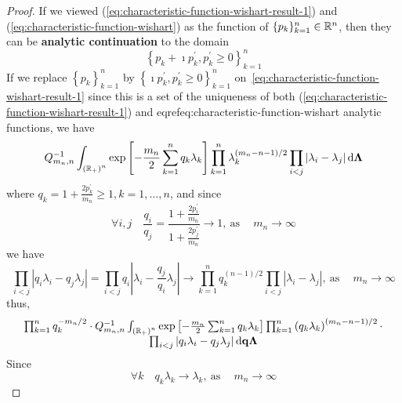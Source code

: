 \begin{proof}
	If we viewed (\ref{eq:characteristic-function-wishart-result-1}) and (\ref{eq:characteristic-function-wishart}) as the function of \(\{p_{k}\}_{k=1}^{n}\in\mathbb{R}^{n}\), then they can be \textbf{analytic continuation} to the domain
	\begin{equation*}
		\left\{p_{k}+\imath p_{k}^{\prime},p_{k}^{\prime}\geq 0\right\}_{k=1}^{n}
	\end{equation*}
	If we replace \(\left\{p_{k}\right\}_{k=1}^{n}\) by \(\left\{\imath p_{k}^{\prime},p_{k}^{\prime}\geq 0\right\}_{k=1}^{n}\) on~\eqref{eq:characteristic-function-wishart-result-1} since this is a set of the uniqueness of both (\ref{eq:characteristic-function-wishart-result-1}) and eqref{eq:characteristic-function-wishart} analytic functions, we have
	\begin{equation*}
		Q_{m_{n},n}^{-1}\int_{\left(\mathbb{R}_{+}\right)^{n}}\exp\left[-\frac{m_{n}}{2}\sum_{k=1}^{n}q_{k}\lambda_{k}\right]\prod_{k=1}^{n}\lambda_{k}^{(m_{n}-n-1)/2}\prod_{i<j}\left|\lambda_{i}-\lambda_{j}\right|\mathop{}\!\mathrm{d}\boldsymbol{\Lambda}
	\end{equation*}
	where \(q_{k}=1+\frac{2p_{k}^{\prime}}{m_{n}}\geq 1,k=1,\ldots,n\), and since
	\begin{equation*}
		\forall i,j\quad\frac{q_{i}}{q_{j}}=\frac{1+\frac{2p_{i}^{\prime}}{m_{n}}}{1+\frac{2p_{j}^{\prime}}{m_{n}}}\rightarrow 1,\ \text{as}\ \quad m_{n}\rightarrow\infty
	\end{equation*}
	we have
	\begin{equation*}
		\prod_{i<j}\left|q_{i}\lambda_{i}-q_{j}\lambda_{j}\right|=\prod_{i<j}q_{i}\left|\lambda_{i}-\frac{q_{j}}{q_{i}}\lambda_{j}\right|\rightarrow\prod_{k=1}^{n}q_{k}^{(n-1)/2}\prod_{i<j}\left|\lambda_{i}-\lambda_{j}\right|,\ \text{as}\ \quad m_{n}\rightarrow\infty
	\end{equation*}
	thus,
	\begin{equation*}
		\begin{array}{c}
			\prod_{k=1}^{n}q_{k}^{-m_{n}/2}\cdot Q_{m_{n},n}^{-1}\int_{\left(\mathbb{R}_{+}\right)^{n}}\exp\left[-\frac{m_{n}}{2}\sum_{k=1}^{n}q_{k}\lambda_{k}\right]\prod_{k=1}^{n}\left(q_{k}\lambda_{k}\right)^{(m_{n}-n-1)/2}\cdot \\
			\prod_{i<j}\left|q_{i}\lambda_{i}-q_{j}\lambda_{j}\right|\mathop{}\!\mathrm{d}\mathbf{q}\boldsymbol{\Lambda}
		\end{array}
	\end{equation*}
	Since
	\begin{equation*}
		\forall k\quad q_{k}\lambda_{k}\rightarrow\lambda_{k},\ \text{as}\ \quad m_{n}\rightarrow\infty
	\end{equation*}

\end{proof}
